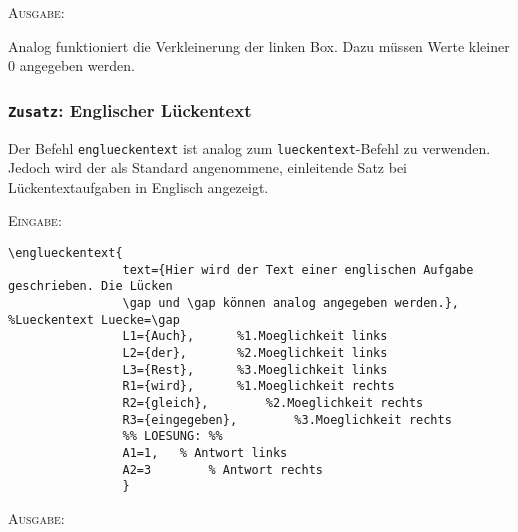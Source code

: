 \documentclass[a4paper,12pt]{article}
\begin{document}
\begin{minipage}{1.0\textwidth}
\textsc{Ausgabe:}



\end{minipage}

Analog funktioniert die Verkleinerung der linken Box. Dazu müssen Werte kleiner 0 angegeben
werden.

\subsubsection{\texttt{Zusatz}: Englischer Lückentext}
Der Befehl \texttt{englueckentext} ist analog zum \texttt{lueckentext}-Befehl zu verwenden. Jedoch wird der als Standard angenommene, einleitende Satz bei Lückentextaufgaben in Englisch angezeigt. 

\textsc{Eingabe:} 
\begin{verbatim}
\englueckentext{
				text={Hier wird der Text einer englischen Aufgabe geschrieben. Die Lücken 
				\gap und \gap können analog angegeben werden.}, 	%Lueckentext Luecke=\gap
				L1={Auch}, 		%1.Moeglichkeit links  
				L2={der}, 		%2.Moeglichkeit links
				L3={Rest}, 		%3.Moeglichkeit links
				R1={wird}, 		%1.Moeglichkeit rechts 
				R2={gleich}, 		%2.Moeglichkeit rechts
				R3={eingegeben}, 		%3.Moeglichkeit rechts
				%% LOESUNG: %%
				A1=1,   % Antwort links
				A2=3		% Antwort rechts 
				}
\end{verbatim}

\textsc{Ausgabe:}
\end{document}
